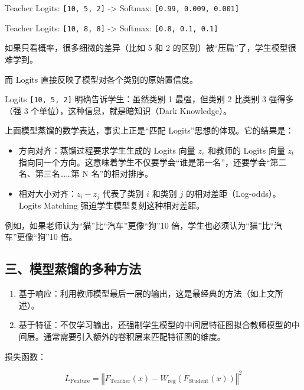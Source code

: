 Teacher Logits: \texttt{{[}10,\ 5,\ 2{]}} -\textgreater{} Softmax: \texttt{{[}0.99,\ 0.009,\ 0.001{]}}

Teacher Logits: \texttt{{[}10,\ 8,\ 8{]}} -\textgreater{} Softmax: \texttt{{[}0.8,\ 0.1,\ 0.1{]}}

如果只看概率，很多细微的差异（比如 5 和 2 的区别）被``压扁''了，学生模型很难学到。

而 Logits 直接反映了模型对各个类别的原始置信度。

Logits \texttt{{[}10,\ 5,\ 2{]}} 明确告诉学生：虽然类别 1 最强，但类别 2 比类别 3 强得多（强 3 个单位），这种信息，就是暗知识（Dark Knowledge）。

上面模型蒸馏的数学表达，事实上正是``匹配 Logits''思想的体现。它的结果是：

\begin{itemize}
\tightlist
\item
  方向对齐：蒸馏过程要求学生生成的 Logits 向量 \(z_s\) 和教师的 Logits 向量 \(z_t\) 指向同一个方向。这意味着学生不仅要学会``谁是第一名''，还要学会``第二名、第三名\ldots\ldots 第 N 名''的相对排序。
\item
  相对大小对齐：\(z_i - z_j\) 代表了类别 \(i\) 和类别 \(j\) 的相对差距（Log-odds）。Logits Matching 强迫学生模型复刻这种相对差距。
\end{itemize}

例如，如果老师认为``猫''比``汽车''更像``狗''10 倍，学生也必须认为``猫''比``汽车''更像``狗''10 倍。

\hypertarget{ux4e09ux6a21ux578bux84b8ux998fux7684ux591aux79cdux65b9ux6cd5}{%
\subsection{三、模型蒸馏的多种方法}\label{ux4e09ux6a21ux578bux84b8ux998fux7684ux591aux79cdux65b9ux6cd5}}

\begin{enumerate}
\def\labelenumi{\arabic{enumi}.}
\item
  基于响应：利用教师模型最后一层的输出，这是最经典的方法（如上文所述）。
\item
  基于特征：不仅学习输出，还强制学生模型的中间层特征图拟合教师模型的中间层。通常需要引入额外的卷积层来匹配特征图的维度。
\end{enumerate}

损失函数：

\[
L_{\mathrm{Feature}} = \left\Vert F_{\mathrm{Teacher}}(x) - W_{\mathrm{reg}}\left(F_{\mathrm{Student}}(x)\right) \right\Vert^2
\]


